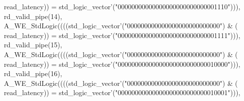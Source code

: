 \begin{DoxyCode}
{      read_latency}\textcolor{vhdlchar}{)}\textcolor{vhdlchar}{)} \textcolor{vhdlchar}{=} \textcolor{comment}{std\_logic\_vector}\textcolor{vhdlchar}{'}\textcolor{vhdlchar}{(}\textcolor{vhdllogic}{"00000000000000000000000000001110"}\textcolor{vhdlchar}{)}\textcolor{vhdlchar}{)}\textcolor{vhdlchar}{)}\textcolor{vhdlchar}{,} \textcolor{vhdlchar}{
      rd_valid_pipe}\textcolor{vhdlchar}{(}\textcolor{vhdllogic}{}\textcolor{vhdllogic}{14}\textcolor{vhdlchar}{)}\textcolor{vhdlchar}{,} \textcolor{vhdlchar}{A\_WE\_StdLogic}\textcolor{vhdlchar}{(}\textcolor{vhdlchar}{(}\textcolor{vhdlchar}{(}\textcolor{vhdlchar}{(}\textcolor{comment}{std\_logic\_vector}\textcolor{vhdlchar}{'}\textcolor{vhdlchar}{(}\textcolor{vhdllogic}{"000000000000000000000000000"}\textcolor{vhdlchar}{)} \textcolor{vhdlchar}{&} \textcolor{vhdlchar}{(}\textcolor{vhdlchar}{
      read_latency}\textcolor{vhdlchar}{)}\textcolor{vhdlchar}{)} \textcolor{vhdlchar}{=} \textcolor{comment}{std\_logic\_vector}\textcolor{vhdlchar}{'}\textcolor{vhdlchar}{(}\textcolor{vhdllogic}{"00000000000000000000000000001111"}\textcolor{vhdlchar}{)}\textcolor{vhdlchar}{)}\textcolor{vhdlchar}{)}\textcolor{vhdlchar}{,} \textcolor{vhdlchar}{
      rd_valid_pipe}\textcolor{vhdlchar}{(}\textcolor{vhdllogic}{}\textcolor{vhdllogic}{15}\textcolor{vhdlchar}{)}\textcolor{vhdlchar}{,} \textcolor{vhdlchar}{A\_WE\_StdLogic}\textcolor{vhdlchar}{(}\textcolor{vhdlchar}{(}\textcolor{vhdlchar}{(}\textcolor{vhdlchar}{(}\textcolor{comment}{std\_logic\_vector}\textcolor{vhdlchar}{'}\textcolor{vhdlchar}{(}\textcolor{vhdllogic}{"000000000000000000000000000"}\textcolor{vhdlchar}{)} \textcolor{vhdlchar}{&} \textcolor{vhdlchar}{(}\textcolor{vhdlchar}{
      read_latency}\textcolor{vhdlchar}{)}\textcolor{vhdlchar}{)} \textcolor{vhdlchar}{=} \textcolor{comment}{std\_logic\_vector}\textcolor{vhdlchar}{'}\textcolor{vhdlchar}{(}\textcolor{vhdllogic}{"00000000000000000000000000010000"}\textcolor{vhdlchar}{)}\textcolor{vhdlchar}{)}\textcolor{vhdlchar}{)}\textcolor{vhdlchar}{,} \textcolor{vhdlchar}{
      rd_valid_pipe}\textcolor{vhdlchar}{(}\textcolor{vhdllogic}{}\textcolor{vhdllogic}{16}\textcolor{vhdlchar}{)}\textcolor{vhdlchar}{,} \textcolor{vhdlchar}{A\_WE\_StdLogic}\textcolor{vhdlchar}{(}\textcolor{vhdlchar}{(}\textcolor{vhdlchar}{(}\textcolor{vhdlchar}{(}\textcolor{comment}{std\_logic\_vector}\textcolor{vhdlchar}{'}\textcolor{vhdlchar}{(}\textcolor{vhdllogic}{"000000000000000000000000000"}\textcolor{vhdlchar}{)} \textcolor{vhdlchar}{&} \textcolor{vhdlchar}{(}\textcolor{vhdlchar}{
      read_latency}\textcolor{vhdlchar}{)}\textcolor{vhdlchar}{)} \textcolor{vhdlchar}{=} \textcolor{comment}{std\_logic\_vector}\textcolor{vhdlchar}{'}\textcolor{vhdlchar}{(}\textcolor{vhdllogic}{"00000000000000000000000000010001"}\textcolor{vhdlchar}{)}\textcolor{vhdlchar}{)}\textcolor{vhdlchar}{)}\textcolor{vhdlchar}{,} \textcolor{vhdlchar}{
}
\end{DoxyCode}
